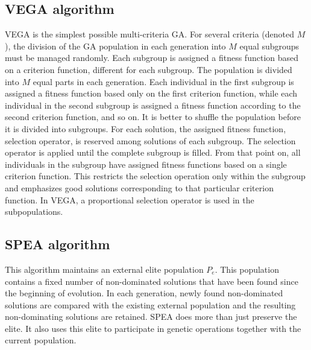\subsection{VEGA algorithm}\label{algorithmVEGA}
VEGA is the simplest
possible multi-criteria GA. For several criteria (denoted $M$), the
division of the GA population in each generation into $M$ equal subgroups must be managed randomly.
Each subgroup is assigned a fitness function based on a criterion function,
different for each subgroup. The population is divided into $M$ equal parts in each generation. Each
individual in the first subgroup is assigned a fitness function based only on the first
criterion function, while each individual in the second subgroup is assigned
a fitness function according to the second criterion function, and so on. It is better to shuffle
the population before it is divided into subgroups. For each solution,
the assigned fitness function, selection operator, is reserved among solutions of each
subgroup. The selection operator is applied until the complete
subgroup is filled. From that point on, all individuals in the subgroup have assigned
fitness functions based on a single criterion function. This restricts the selection
operation only within the subgroup and emphasizes good solutions corresponding to that
particular criterion function. In VEGA, a proportional selection
operator is used in the subpopulations.

\subsection{SPEA algorithm}\label{algorithmSPEA}
This algorithm \cite{evo, thiele} maintains an external elite population $P_e$. This population contains a fixed
number of non-dominated solutions that have been found since the beginning of evolution.
In each generation, newly found non-dominated solutions are compared with
the existing external population and the resulting non-dominating solutions are retained.
SPEA does more than just preserve the elite. It also uses this elite to participate in
genetic operations together with the current population.

